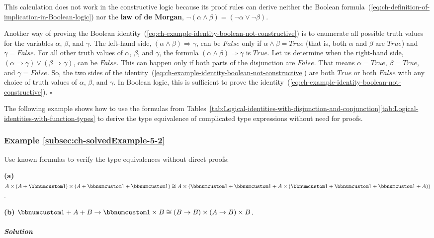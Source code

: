 This calculation does not work in the constructive logic because its
proof rules can derive neither the Boolean formula~(\ref{eq:ch-definition-of-implication-in-Boolean-logic})
nor the \textbf{law of de Morgan}, $\neg(\alpha\wedge\beta)=\left(\neg\alpha\vee\neg\beta\right)$.

Another way of proving the Boolean identity~(\ref{eq:ch-example-identity-boolean-not-constructive})
is to enumerate all possible truth values for the variables $\alpha$,
$\beta$, and $\gamma$. The left-hand side, $\left(\alpha\wedge\beta\right)\Rightarrow\gamma$,
can be $False$ only if $\alpha\wedge\beta=True$ (that is, both $\alpha$
and $\beta$ are $True$) and $\gamma=False$. For all other truth
values of $\alpha$, $\beta$, and $\gamma$, the formula $\left(\alpha\wedge\beta\right)\Rightarrow\gamma$
is $True$. Let us determine when the right-hand side, $(\alpha\Rightarrow\gamma)\vee(\beta\Rightarrow\gamma)$,
can be $False$. This can happen only if both parts of the disjunction
are $False$. That means $\alpha=True$, $\beta=True$, and $\gamma=False$.
So, the two sides of the identity~(\ref{eq:ch-example-identity-boolean-not-constructive})
are both $True$ or both $False$ with any choice of truth values
of $\alpha$, $\beta$, and $\gamma$. In Boolean logic, this is sufficient
to prove the identity~(\ref{eq:ch-example-identity-boolean-not-constructive}).
$\square$

The following example shows how to use the formulas from Tables~\ref{tab:Logical-identities-with-disjunction-and-conjunction}\textendash \ref{tab:Logical-identities-with-function-types}
to derive the type equivalence of complicated type expressions without
need for proofs.

\subsubsection{Example \label{subsec:ch-solvedExample-5-2}\ref{subsec:ch-solvedExample-5-2}}

Use known formulas to verify the type equivalences without direct
proofs:

\textbf{(a)} $A\times\left(A+\bbnum 1\right)\times\left(A+\bbnum 1+\bbnum 1\right)\cong A\times\left(\bbnum 1+\bbnum 1+A\times\left(\bbnum 1+\bbnum 1+\bbnum 1+A\right)\right)$.

\textbf{(b)} $\bbnum 1+A+B\rightarrow\bbnum 1\times B\cong\left(B\rightarrow B\right)\times\left(A\rightarrow B\right)\times B$.

\subparagraph{Solution}

